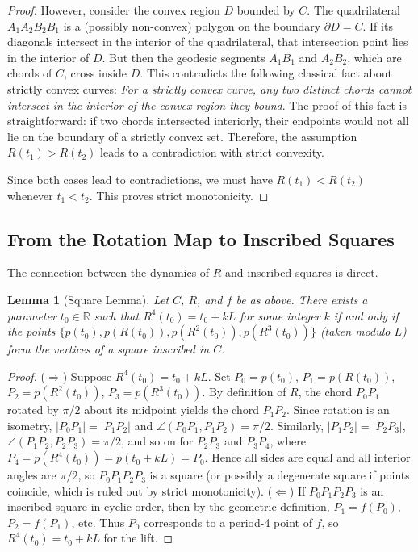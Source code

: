\documentclass{article}
\newtheorem{lemma}[theorem]{Lemma}
\begin{document}
\begin{proof}
    However, consider the convex region $D$ bounded by $C$. The quadrilateral $A_1A_2B_2B_1$ is a (possibly non-convex) polygon on the boundary $\partial D = C$. If its diagonals intersect in the interior of the quadrilateral, that intersection point lies in the interior of $D$. But then the geodesic segments $A_1B_1$ and $A_2B_2$, which are chords of $C$, cross inside $D$. This contradicts the following classical fact about strictly convex curves: \emph{For a strictly convex curve, any two distinct chords cannot intersect in the interior of the convex region they bound}. The proof of this fact is straightforward: if two chords intersected interiorly, their endpoints would not all lie on the boundary of a strictly convex set. Therefore, the assumption $R(t_1) > R(t_2)$ leads to a contradiction with strict convexity.

    Since both cases lead to contradictions, we must have $R(t_1) < R(t_2)$ whenever $t_1 < t_2$. This proves strict monotonicity.
\end{proof}

\subsection{From the Rotation Map to Inscribed Squares}

The connection between the dynamics of $R$ and inscribed squares is direct.

\begin{lemma}[Square Lemma]\label{lem:square}
    Let $C$, $R$, and $f$ be as above. There exists a parameter $t_0 \in \mathbb{R}$ such that $R^4(t_0) = t_0 + kL$ for some integer $k$ if and only if the points $\{p(t_0), p(R(t_0)), p(R^2(t_0)), p(R^3(t_0))\}$ (taken modulo $L$) form the vertices of a square inscribed in $C$.
\end{lemma}
\begin{proof}
    ($\Rightarrow$) Suppose $R^4(t_0) = t_0 + kL$. Set $P_0 = p(t_0)$, $P_1 = p(R(t_0))$, $P_2 = p(R^2(t_0))$, $P_3 = p(R^3(t_0))$. By definition of $R$, the chord $P_0P_1$ rotated by $\pi/2$ about its midpoint yields the chord $P_1P_2$. Since rotation is an isometry, $|P_0P_1| = |P_1P_2|$ and $\angle(P_0P_1, P_1P_2) = \pi/2$. Similarly, $|P_1P_2| = |P_2P_3|$, $\angle(P_1P_2, P_2P_3) = \pi/2$, and so on for $P_2P_3$ and $P_3P_4$, where $P_4 = p(R^4(t_0)) = p(t_0 + kL) = P_0$. Hence all sides are equal and all interior angles are $\pi/2$, so $P_0P_1P_2P_3$ is a square (or possibly a degenerate square if points coincide, which is ruled out by strict monotonicity).
   ($\Leftarrow$) If $P_0P_1P_2P_3$ is an inscribed square in cyclic order, then by the geometric definition, $P_1 = f(P_0)$, $P_2 = f(P_1)$, etc. Thus $P_0$ corresponds to a period-4 point of $f$, so $R^4(t_0) = t_0 + kL$ for the lift.
\end{proof}
\end{document}
